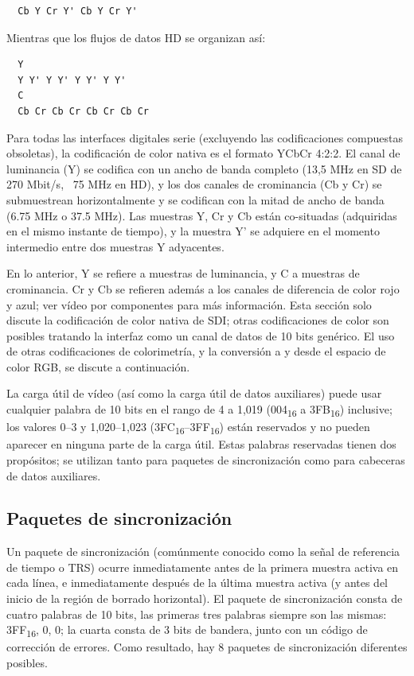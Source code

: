   \begin{verbatim}
  Cb Y Cr Y' Cb Y Cr Y'
  \end{verbatim}

  Mientras que los flujos de datos HD se organizan así:

  \begin{verbatim}
  Y
  Y Y' Y Y' Y Y' Y Y'
  C
  Cb Cr Cb Cr Cb Cr Cb Cr
  \end{verbatim}

  Para todas las interfaces digitales serie (excluyendo las codificaciones compuestas
  obsoletas), la codificación de color nativa es el formato YCbCr 4:2:2. El canal de
  luminancia (Y) se codifica con un ancho de banda completo (13,5 MHz en SD de 270 Mbit/s,
  ~75 MHz en HD), y los dos canales de crominancia (Cb y Cr) se submuestrean horizontalmente
  y se codifican con la mitad de ancho de banda (6.75 MHz o 37.5 MHz). Las muestras Y, Cr y
  Cb están co-situadas (adquiridas en el mismo instante de tiempo), y la muestra Y' se
  adquiere en el momento intermedio entre dos muestras Y adyacentes.

  En lo anterior, Y se refiere a muestras de luminancia, y C a muestras de crominancia. Cr y
  Cb se refieren además a los canales de diferencia de color rojo y azul; ver vídeo por
  componentes para más información. Esta sección solo discute la codificación de color nativa
  de SDI\@; otras codificaciones de color son posibles tratando la interfaz como un canal de
  datos de 10 bits genérico. El uso de otras codificaciones de colorimetría, y la conversión
  a y desde el espacio de color RGB, se discute a continuación.

  La carga útil de vídeo (así como la carga útil de datos auxiliares) puede usar cualquier
  palabra de 10 bits en el rango de 4 a 1,019 (004\textsubscript{16} a 3FB\textsubscript{16})
  inclusive; los valores 0–3 y 1,020–1,023 (3FC\textsubscript{16}–3FF\textsubscript{16}) están
  reservados y no pueden aparecer en ninguna parte de la carga útil. Estas palabras reservadas
  tienen dos propósitos; se utilizan tanto para paquetes de sincronización como para cabeceras
  de datos auxiliares.

  \subsection{Paquetes de sincronización}

  Un paquete de sincronización (comúnmente conocido como la señal de referencia de tiempo o TRS)
  ocurre inmediatamente antes de la primera muestra activa en cada línea, e inmediatamente después
  de la última muestra activa (y antes del inicio de la región de borrado horizontal). El paquete
  de sincronización consta de cuatro palabras de 10 bits, las primeras tres palabras siempre son
  las mismas: 3FF\textsubscript{16}, 0, 0; la cuarta consta de 3 bits de bandera, junto con un código de corrección
  de errores. Como resultado, hay 8 paquetes de sincronización diferentes posibles.


